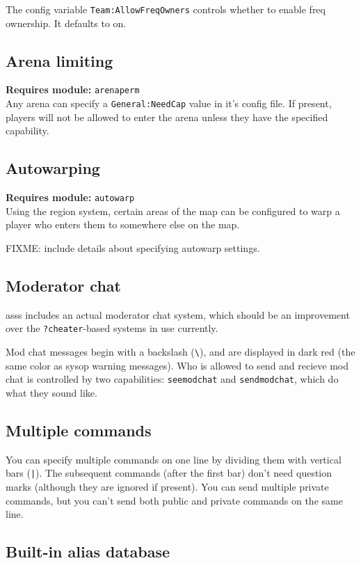 \documentclass{article}
\newcommand{\asss}{asss}
\newcommand{\requiremod}[1]{\noindent\textbf{Requires module:} \texttt{#1}\\}
\begin{document}
The config variable \texttt{Team:AllowFreqOwners} controls whether to
enable freq ownership. It defaults to on.

\subsection{Arena limiting}

\requiremod{arenaperm}
Any arena can specify a \texttt{General:NeedCap} value in it's config
file. If present, players will not be allowed to enter the arena unless
they have the specified capability.


\subsection{Autowarping}

\requiremod{autowarp}
Using the region system, certain areas of the map can be configured to
warp a player who enters them to somewhere else on the map.

FIXME: include details about specifying autowarp settings.


\subsection{Moderator chat}

\asss{} includes an actual moderator chat system, which should be an
improvement over the \verb/?cheater/-based systems in use currently.

Mod chat messages begin with a backslash (\verb/\/), and are displayed
in dark red (the same color as sysop warning messages). Who is allowed
to send and recieve mod chat is controlled by two capabilities:
\texttt{seemodchat} and \texttt{sendmodchat}, which do what they sound
like.


\subsection{Multiple commands}

You can specify multiple commands on one line by dividing them with
vertical bars (\verb/|/). The subsequent commands (after the first bar)
don't need question marks (although they are ignored if present). You
can send multiple private commands, but you can't send both public and
private commands on the same line.


\subsection{Built-in alias database}
\end{document}
